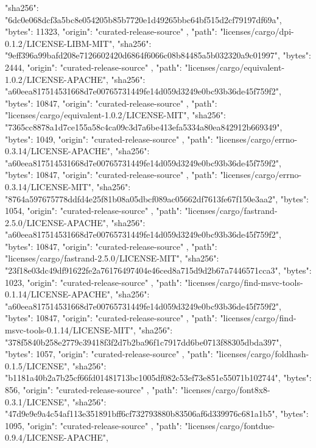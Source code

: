 {{      "sha256": "6dc0e068dcf3a5bc8e054205b85b7720e1d49265bbc64bf515d2cf79197df69a",
      "bytes": 11323,
      "origin": "curated-release-source"
    },
    {
      "path": "licenses/cargo/dpi-0.1.2/LICENSE-LIBM-MIT",
      "sha256": "9eff396a99bafd208e7126602420d6864f6066c08b84485a5b032320a9c01997",
      "bytes": 2444,
      "origin": "curated-release-source"
    },
    {
      "path": "licenses/cargo/equivalent-1.0.2/LICENSE-APACHE",
      "sha256": "a60eea817514531668d7e00765731449fe14d059d3249e0bc93b36de45f759f2",
      "bytes": 10847,
      "origin": "curated-release-source"
    },
    {
      "path": "licenses/cargo/equivalent-1.0.2/LICENSE-MIT",
      "sha256": "7365cc8878a1d7ce155a58c4ca09c3d7a6be413efa5334a80ea842912b669349",
      "bytes": 1049,
      "origin": "curated-release-source"
    },
    {
      "path": "licenses/cargo/errno-0.3.14/LICENSE-APACHE",
      "sha256": "a60eea817514531668d7e00765731449fe14d059d3249e0bc93b36de45f759f2",
      "bytes": 10847,
      "origin": "curated-release-source"
    },
    {
      "path": "licenses/cargo/errno-0.3.14/LICENSE-MIT",
      "sha256": "8764a597675778ddfd4e25f81b08a05dbcf089ac05662df7613fe67f150e3aa2",
      "bytes": 1054,
      "origin": "curated-release-source"
    },
    {
      "path": "licenses/cargo/fastrand-2.5.0/LICENSE-APACHE",
      "sha256": "a60eea817514531668d7e00765731449fe14d059d3249e0bc93b36de45f759f2",
      "bytes": 10847,
      "origin": "curated-release-source"
    },
    {
      "path": "licenses/cargo/fastrand-2.5.0/LICENSE-MIT",
      "sha256": "23f18e03dc49df91622fe2a76176497404e46ced8a715d9d2b67a7446571cca3",
      "bytes": 1023,
      "origin": "curated-release-source"
    },
    {
      "path": "licenses/cargo/find-msvc-tools-0.1.14/LICENSE-APACHE",
      "sha256": "a60eea817514531668d7e00765731449fe14d059d3249e0bc93b36de45f759f2",
      "bytes": 10847,
      "origin": "curated-release-source"
    },
    {
      "path": "licenses/cargo/find-msvc-tools-0.1.14/LICENSE-MIT",
      "sha256": "378f5840b258e2779c39418f3f2d7b2ba96f1c7917dd6be0713f88305dbda397",
      "bytes": 1057,
      "origin": "curated-release-source"
    },
    {
      "path": "licenses/cargo/foldhash-0.1.5/LICENSE",
      "sha256": "b1181a40b2a7b25cf66fd01481713bc1005df082c53ef73e851e55071b102744",
      "bytes": 856,
      "origin": "curated-release-source"
    },
    {
      "path": "licenses/cargo/font8x8-0.3.1/LICENSE",
      "sha256": "47d9e9e9a4c54af113e351891bff6cf732793880b83506af6d339976c681a1b5",
      "bytes": 1095,
      "origin": "curated-release-source"
    },
    {
      "path": "licenses/cargo/fontdue-0.9.4/LICENSE-APACHE",
}}
